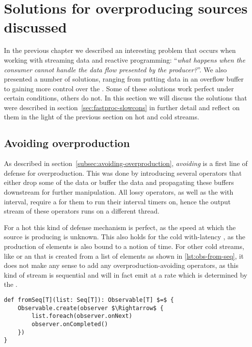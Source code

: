 \section{Solutions for overproducing sources discussed}
In the previous chapter we described an interesting problem that occurs when working with streaming data and reactive programming: ``\textit{what happens when the consumer cannot handle the data flow presented by the producer?}''. We also presented a number of solutions, ranging from putting data in an overflow buffer to gaining more control over the \obs. Some of these solutions work perfect under certain conditions, others do not. In this section we will discuss the solutions that were described in section~\ref{sec:fastproc-slowcons} in further detail and reflect on them in the light of the previous section on hot and cold streams.

\subsection{Avoiding overproduction}
As described in section~\ref{subsec:avoiding-overproduction}, \textit{avoiding} is a first line of defense for overproduction. This was done by introducing several operators that either drop some of the data or buffer the data and propagating these buffers downstream for further manipulation. All lossy operators, as well as the  with interval, require a \sch for them to run their interval timers on, hence the output stream of these operators runs on a different thread.

For a hot \obs this kind of defense mechanism is perfect, as the speed at which the source is producing is unknown. This also holds for the cold with-latency \obs, as the production of elements is also bound to a notion of time. For other cold streams, like  or an \obs that is created from a list of elements as shown in \autoref{lst:obs-from-seq}, it does not make any sense to add any overproduction-avoiding operators, as this kind of stream is sequential and will in fact emit at a rate which is determined by the \obv.

\begin{minipage}{\linewidth}
\begin{lstlisting}[style=ScalaStyle, caption={Observable from \code{Seq[T]}}, label={lst:obs-from-seq}]
def fromSeq[T](list: Seq[T]): Observable[T] $=$ {
    Observable.create(observer $\Rightarrow$ {
        list.foreach(observer.onNext)
        observer.onCompleted()
    })
}
\end{lstlisting}
\end{minipage}

